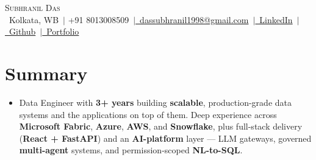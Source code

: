\documentclass[letterpaper,10pt]{article}
\newcommand{\resumeSubHeadingListStart}{\begin{itemize}[leftmargin=0.0in, label={}]}
\newcommand{\resumeSubHeadingListEnd}{\end{itemize}}
\begin{document}
\begin{center}
    {\Huge \scshape Subhranil Das} \\ \vspace{1pt}
    \small
    \raisebox{-0.1\height}\ Kolkata, WB~$|$ +91 8013008509~$|$\href{mailto:dassubhranil1998@gmail.com}{\ dassubhranil1998@gmail.com}~$|$\href{https://linkedin.com/in/subhranil-das/}{\ LinkedIn}~$| $\href{https://github.com/dassubhranil/}{\ Github}~$| $\href{https://subhranildas.vercel.app/}{\ Portfolio}
    \vspace{-15pt}
\end{center}
\section{Summary}
\resumeSubHeadingListStart
\item{Data Engineer with \textbf{3+ years} building \textbf{scalable}, production-grade data systems and the applications on top of them. Deep experience across \textbf{Microsoft Fabric}, \textbf{Azure}, \textbf{AWS}, and \textbf{Snowflake}, plus full-stack delivery (\textbf{React + FastAPI}) and an \textbf{AI-platform} layer --- LLM gateways, governed \textbf{multi-agent} systems, and permission-scoped \textbf{NL-to-SQL}.
}
\resumeSubHeadingListEnd
\vspace{-20pt}


\end{document}
